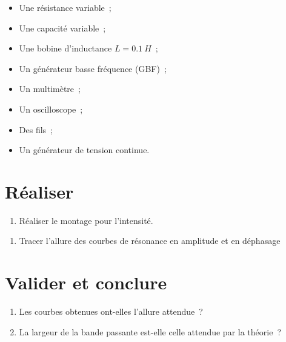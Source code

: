 \documentclass[a4paper, 11pt, final, garamond]{book}
\begin{document}
\begin{minipage}{0.50\linewidth}
    \begin{itemize}
        \item Une résistance variable~;
        \item Une capacité variable~;
        \item Une bobine d'inductance $L = \SI{0,1}{H}$~;
        \item Un générateur basse fréquence (GBF)~; 
    \end{itemize}
\end{minipage}
\begin{minipage}{0.50\linewidth}
    \begin{itemize}
        \item Un multimètre~;
        \item Un oscilloscope~;
        \item Des fils~;
        \item Un générateur de tension continue. 
    \end{itemize}
\end{minipage}

\section{Réaliser}

\begin{enumerate}
    \item Réaliser le montage pour l'intensité.
\end{enumerate}
\begin{enumerate}[label=\sqenumi, start=4]
    \item Tracer l'allure des courbes de résonance en amplitude et en déphasage
\end{enumerate}

\section{Valider et conclure}

\begin{enumerate}[label=\sqenumi, start=5]
    \item Les courbes obtenues ont-elles l'allure attendue~?
    \item La largeur de la bande passante est-elle celle attendue par la théorie~?
\end{enumerate}
\end{document}

